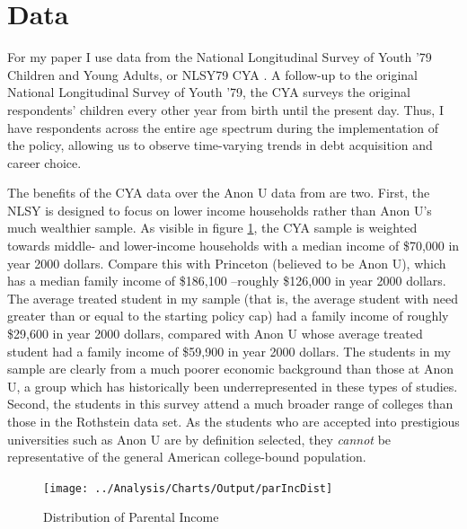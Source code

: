 \documentclass[12pt]{article}
\begin{document}
	
	
	\section{Data}
	
	For my paper I use data from the National Longitudinal Survey of Youth '79 Children and Young Adults, or NLSY79 CYA \parencite{bls2018}. A follow-up to the original National Longitudinal Survey of Youth '79, the CYA surveys the original respondents' children every other year from birth until the present day. Thus, I have respondents across the entire age spectrum during the implementation of the policy, allowing us to observe time-varying trends in debt acquisition and career choice. 
	
	The benefits of the CYA data over the Anon U data from \textcite{rothstein2011} are two. First, the NLSY is designed to focus on lower income households rather than Anon U's much wealthier sample. As visible in figure \ref{incDist}, the CYA sample is weighted towards middle- and lower-income households with a median income of \$70,000 in year 2000 dollars. Compare this with Princeton (believed to be Anon U), which has a median family income of \$186,100 \parencite{aisch2017}--roughly \$126,000 in year 2000 dollars. The average treated student in my sample (that is, the average student with need greater than or equal to the starting policy cap) had a family income of roughly \$29,600 in year 2000 dollars, compared with Anon U whose average treated student had a family income of \$59,900 in year 2000 dollars. The students in my sample are clearly from a much poorer economic background than those at Anon U, a group which has historically been underrepresented in these types of studies. Second, the students in this survey attend a much broader range of colleges than those in the Rothstein data set. As the students who are accepted into prestigious universities such as Anon U are by definition selected, they \emph{cannot} be representative of the general American college-bound population. 
	
	\begin{figure}
		\centering
		\caption{Distribution of Parental Income}
		\label{incDist}
		\texttt{[image: ../Analysis/Charts/Output/parIncDist]}
	\end{figure}
	
\end{document}
